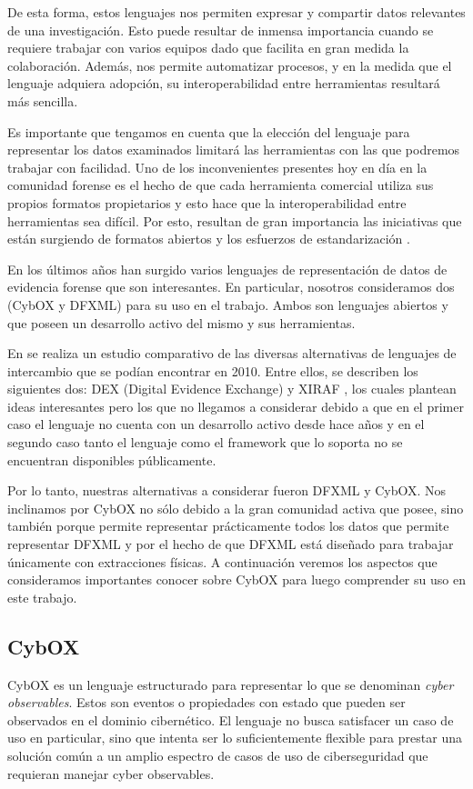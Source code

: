 De esta forma, estos lenguajes nos permiten expresar y compartir datos relevantes de una investigación. Esto puede resultar de inmensa importancia cuando se requiere trabajar con varios equipos dado que facilita en gran medida la colaboración. Además, nos permite automatizar procesos, y en la medida que el lenguaje adquiera adopción, su interoperabilidad entre herramientas resultará más sencilla.

Es importante que tengamos en cuenta que la elección del lenguaje para representar los datos examinados limitará las herramientas con las que podremos trabajar con facilidad. Uno de los inconvenientes presentes hoy en día en la comunidad forense es el hecho de que cada herramienta comercial utiliza sus propios formatos propietarios y esto hace que la interoperabilidad entre herramientas sea difícil. Por esto, resultan de gran importancia las iniciativas que están surgiendo de formatos abiertos y los esfuerzos de estandarización \cite{oasisAdAutomaged}.

En los últimos años han surgido varios lenguajes de representación de datos de evidencia forense que son interesantes. En particular, nosotros consideramos dos (CybOX y DFXML) para su uso en el trabajo. Ambos son lenguajes abiertos y que poseen un desarrollo activo del mismo y sus herramientas.

En \cite{storageAndExchange} se realiza un estudio comparativo de las diversas alternativas de lenguajes de intercambio que se podían encontrar en 2010. Entre ellos, se describen los siguientes dos: DEX (Digital Evidence Exchange) \cite{DexDigitalEvidence} y XIRAF \cite{DexXmlBased}, los cuales plantean ideas interesantes pero los que no llegamos a considerar debido a que en el primer caso el lenguaje no cuenta con un desarrollo activo desde hace años y en el segundo caso tanto el lenguaje como el framework que lo soporta no se encuentran disponibles públicamente. 

Por lo tanto, nuestras alternativas a considerar fueron DFXML y CybOX. Nos inclinamos por CybOX no sólo debido a la gran comunidad activa que posee, sino también porque permite representar prácticamente todos los datos que permite representar DFXML y por el hecho de que DFXML está diseñado para trabajar únicamente con extracciones físicas. A continuación veremos los aspectos que consideramos importantes conocer sobre CybOX para luego comprender su uso en este trabajo.

\subsection{CybOX}
\label{estadoDelArte:CybOX}
CybOX \cite{cyboxGitHub} es un lenguaje estructurado para representar lo que se denominan \emph{cyber observables}. Estos son eventos o propiedades con estado que pueden ser observados en el dominio cibernético. El lenguaje no busca satisfacer un caso de uso en particular, sino que intenta ser lo suficientemente flexible para prestar una solución común a un amplio espectro de casos de uso de ciberseguridad que requieran manejar cyber observables.


